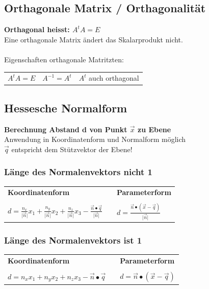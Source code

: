			\subsection{Orthagonale Matrix / Orthagonalität}
			\textbf{Orthagonal heisst: $A^t A = E$}\\		
			Eine orthagonale Matrix ändert das Skalarprodukt nicht. \\
			\\
			Eigenschaften orthagonale Matritzten: \\
			\begin{tabular}{lll}
			$A^t A = E$ & $A^{-1} = A^t$ & $A^t$ auch orthagonal
			\end{tabular}
				
			
			\subsection{Hessesche Normalform}
			\textbf{Berechnung Abstand d von Punkt $\vec{x}$ zu Ebene}  \\
			Anwendung in Koordinatenform und Normalform möglich \\
			$\vec{q}$ entspricht dem Stützvektor der Ebene! 
			
			\subsubsection{Länge des Normalenvektors nicht 1}
			
			\begin{tabular}{lll}
			\textbf{Koordinatenform} & & \textbf{Parameterform} \\
			\\
			
			$d = \frac{n_x}{\vert \vec{n} \vert} x_1 + \frac{n_y}{\vert \vec{n} \vert} x_2 + \frac{n_z}{\vert \vec{n} \vert} x_3 - \frac{\vec{n} \bullet \vec{q}}{\vert \vec{n} \vert}$ & & $d = \frac{\vec{n} \bullet (\vec{x} - \vec{q})}{\vert \vec{n} \vert}$ \\
			\end{tabular}
			
			\vfill\null
			\columnbreak
			
			
			\subsubsection{Länge des Normalenvektors ist 1}
			
			\begin{tabular}{lll}
			\textbf{Koordinatenform} & & \textbf{Parameterform} \\
			\\
			
			$d = n_x x_1 + n_y x_2 + n_z x_3 - \vec{n} \bullet \vec{q}$ & & $d = \vec{n} \bullet (\vec{x} - \vec{q}) $
			\end{tabular}
				    
